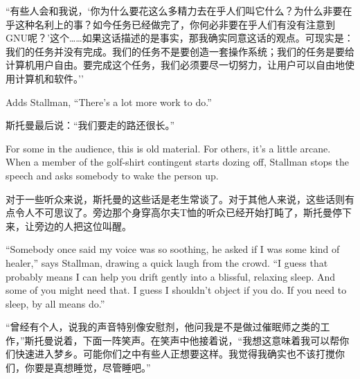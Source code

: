\ifdefined\chs
``有些人会和我说，`你为什么要花这么多精力去在乎人们叫它什么？为什么非要在乎这种名利上的事？如今任务已经做完了，你何必非要在乎人们有没有注意到GNU呢？'这个……如果这话描述的是事实，那我确实同意这话的观点。可现实是：我们的任务并没有完成。我们的任务不是要创造一套操作系统；我们的任务是要给计算机用户自由。要完成这个任务，我们必须要尽一切努力，让用户可以自由地使用计算机和软件。''
\fi

\ifdefined\eng
Adds Stallman, ``There's a lot more work to do.''
\fi

\ifdefined\chs
斯托曼最后说：``我们要走的路还很长。''
\fi

\ifdefined\eng
For some in the audience, this is old material. For others, it's a little arcane. When a member of the golf-shirt contingent starts dozing off, Stallman stops the speech and asks somebody to wake the person up.
\fi

\ifdefined\chs
对于一些听众来说，斯托曼的这些话是老生常谈了。对于其他人来说，这些话则有点令人不可思议了。旁边那个身穿高尔夫T恤的听众已经开始打盹了，斯托曼停下来，让旁边的人把这位叫醒。
\fi

\ifdefined\eng
``Somebody once said my voice was so soothing, he asked if I was some kind of healer,'' says Stallman, drawing a quick laugh from the crowd. ``I guess that probably means I can help you drift gently into a blissful, relaxing sleep. And some of you might need that. I guess I shouldn't object if you do. If you need to sleep, by all means do.''
\fi

\ifdefined\chs
``曾经有个人，说我的声音特别像安慰剂，他问我是不是做过催眠师之类的工作，''斯托曼说着，下面一阵笑声。在笑声中他接着说，``我想这意味着我可以帮你们快速进入梦乡。可能你们之中有些人正想要这样。我觉得我确实也不该打搅你们，你要是真想睡觉，尽管睡吧。''
\fi

